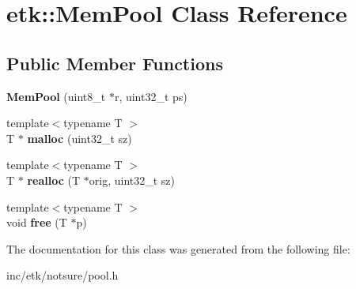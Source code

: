 \hypertarget{classetk_1_1_mem_pool}{\section{etk\-:\-:Mem\-Pool Class Reference}
\label{classetk_1_1_mem_pool}
}
\subsection*{Public Member Functions}
\begin{DoxyCompactItemize}
\item 
\hypertarget{classetk_1_1_mem_pool_a5ae00b86895c7532c172ca8013259fe4}{{\bfseries Mem\-Pool} (uint8\-\_\-t $\ast$r, uint32\-\_\-t ps)}\label{classetk_1_1_mem_pool_a5ae00b86895c7532c172ca8013259fe4}

\item 
\hypertarget{classetk_1_1_mem_pool_a9564bfac02f739228e9f32f8ee8cff33}{{\footnotesize template$<$typename T $>$ }\\T $\ast$ {\bfseries malloc} (uint32\-\_\-t sz)}\label{classetk_1_1_mem_pool_a9564bfac02f739228e9f32f8ee8cff33}

\item 
\hypertarget{classetk_1_1_mem_pool_ab4517722597ceef10808d4443090da73}{{\footnotesize template$<$typename T $>$ }\\T $\ast$ {\bfseries realloc} (T $\ast$orig, uint32\-\_\-t sz)}\label{classetk_1_1_mem_pool_ab4517722597ceef10808d4443090da73}

\item 
\hypertarget{classetk_1_1_mem_pool_a840c8f1a8d95b94126a67af72b0ef4f9}{{\footnotesize template$<$typename T $>$ }\\void {\bfseries free} (T $\ast$p)}\label{classetk_1_1_mem_pool_a840c8f1a8d95b94126a67af72b0ef4f9}

\end{DoxyCompactItemize}


The documentation for this class was generated from the following file\-:\begin{DoxyCompactItemize}
\item 
inc/etk/notsure/pool.\-h\end{DoxyCompactItemize}
